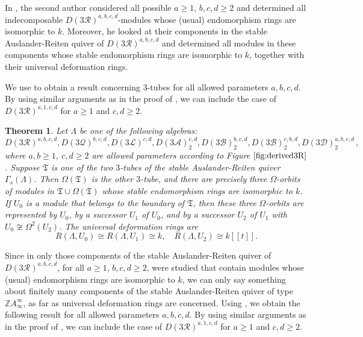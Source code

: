 \documentclass{amsart}
\theoremstyle{plain}
\newtheorem{thm}{Theorem}[subsection]
\theoremstyle{definition}
\theoremstyle{remark}
\begin{document}
In \cite{velez2015}, the second author considered all possible $a\ge 1$, $b,c,d\ge 2$
and determined all indecomposable $D(3\mathcal{R})^{a,b,c,d}$-modules whose (usual) endomorphism rings are isomorphic to $k$. Moreover,
he looked at their components in the stable Auslander-Reiten quiver of $D(3\mathcal{R})^{a,b,c,d}$ and determined all
modules in these components whose stable endomorphism rings are isomorphic to $k$, together with their universal deformation rings. 

We use \cite[Thm. 1.1(iv)]{velez2015} to obtain a result concerning 3-tubes for all allowed parameters
$a,b,c,d$. By using similar arguments as in the proof of \cite[Prop. 4.4]{velez2015}, we can 
include the case of $D(3\mathcal{R})^{a,1,c,d}$ for $a\ge 1$ and $c,d\ge 2$.

\begin{thm}
\label{thm:derivedex3}
Let $\Lambda$ be one of the following algebras:
\begin{equation}
\label{eq:rstu}
D(3\mathcal{R})^{a,b,c,d}, D(3\mathcal{Q})^{b,c,d}, D(3\mathcal{L})^{c,d}, D(3\mathcal{A})_2^{c,d}, D(3\mathcal{B})_2^{b,c,d}, D(3\mathcal{B})_2^{c,b,d}, D(3\mathcal{D})_2^{a,b,c,d}\,,
\end{equation}
where $a,b\ge 1$, $c,d\ge 2$ are allowed parameters according to Figure $\ref{fig:derived3R}$.
Suppose $\mathfrak{T}$ is one of the two $3$-tubes of the stable Auslander-Reiten quiver $\Gamma_s(\Lambda)$.
Then $\Omega(\mathfrak{T})$ is the other $3$-tube, and there are precisely three $\Omega$-orbits of modules in 
$\mathfrak{T}\cup \Omega(\mathfrak{T})$ whose stable endomorphism rings are isomorphic to $k$. 
If $U_0$ is a module that belongs to the boundary of $\mathfrak{T}$, then these three 
$\Omega$-orbits are represented by $U_0$, by a successor $U_1$ of $U_0$, and by a 
successor $U_2$ of $U_1$ with $U_0\not\cong\Omega^2(U_2)$. The universal
deformation rings are 
$$R(\Lambda,U_0)\cong R(\Lambda,U_1)\cong k,\quad R(\Lambda,U_2)\cong k[[t]].$$
\end{thm}

Since
in \cite{velez2015} only those components of the stable Auslander-Reiten quiver of $D(3\mathcal{R})^{a,b,c,d}$,
for all $a\ge 1$, $b,c,d\ge 2$, were studied that contain modules whose (usual) endomorphism rings are isomorphic to $k$,
we can only say something about finitely many components of the stable Auslander-Reiten quiver of type
$\mathbb{Z}A_\infty^\infty$, as far as universal deformation rings are concerned. 
Using \cite[Thm. 1.1(i)-(iii)]{velez2015}, we obtain the following result for all allowed parameters
$a,b,c,d$. By using similar arguments as in the proof of \cite[Props. 4.1-4.3]{velez2015}, we can 
include the case of $D(3\mathcal{R})^{a,1,c,d}$ for $a\ge 1$ and $c,d\ge 2$.
\end{document}
